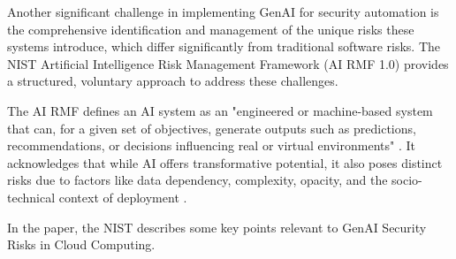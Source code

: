 \newpage

Another significant challenge in implementing GenAI for security automation is the comprehensive identification and management of the unique risks these systems introduce, which differ significantly from traditional software risks. The NIST Artificial Intelligence Risk Management Framework (AI RMF 1.0) \cite{tabassi_artificial_2023} provides a structured, voluntary approach to address these challenges.

The AI RMF defines an AI system as an "engineered or machine-based system that can, for a given set of objectives, generate outputs such as predictions, recommendations, or decisions influencing real or virtual environments" \cite[p.1]{tabassi_artificial_2023}. It acknowledges that while AI offers transformative potential, it also poses distinct risks due to factors like data dependency, complexity, opacity, and the socio-technical context of deployment \cite{tabassi_artificial_2023}.

In the paper, the NIST describes some key points relevant to GenAI Security Risks in Cloud Computing.

